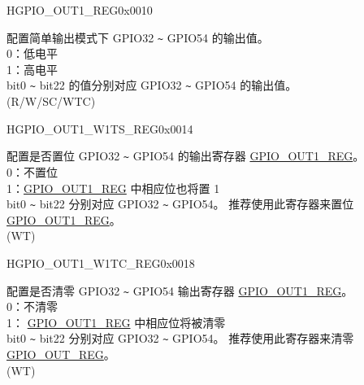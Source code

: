 \begin{register}{H}{GPIO\_OUT1\_REG}{0x0010}\label{regdesc:GPIOOUT1REG}
%
%
\regnewline%
\begin{regdesc}\begin{reglist}
\label{fielddesc:GPIOOUT1DATAORIG}\item [GPIO\_OUT1\_DATA\_ORIG] 配置简单输出模式下 GPIO32 \verb+~+ GPIO54 的输出值。\\
0：低电平\\
1：高电平 \\
 bit0 \verb+~+ bit22 的值分别对应 GPIO32 \verb+~+ GPIO54 的输出值。\\
(R/W/SC/WTC)
\end{reglist}\end{regdesc}
\end{register}


\begin{register}{H}{GPIO\_OUT1\_W1TS\_REG}{0x0014}\label{regdesc:GPIOOUT1W1TSREG}
%
%
\regnewline%
\begin{regdesc}\begin{reglist}
\label{fielddesc:GPIOOUT1W1TS}\item [GPIO\_OUT1\_W1TS] 配置是否置位
 GPIO32 \verb+~+ GPIO54 的输出寄存器 \hyperref[regdesc:GPIOOUT1REG]{GPIO\_OUT1\_REG}。\\
0：不置位\\
1：\hyperref[regdesc:GPIOOUT1REG]{GPIO\_OUT1\_REG} 中相应位也将置 1 \\
bit0 \verb+~+ bit22 分别对应 GPIO32 \verb+~+ GPIO54。
推荐使用此寄存器来置位  \hyperref[regdesc:GPIOOUT1REG]{GPIO\_OUT1\_REG}。\\
(WT)
\end{reglist}\end{regdesc}
\end{register}


\begin{register}{H}{GPIO\_OUT1\_W1TC\_REG}{0x0018}\label{regdesc:GPIOOUT1W1TCREG}
%
%
\regnewline%
\begin{regdesc}\begin{reglist}
\label{fielddesc:GPIOOUT1W1TC}\item [GPIO\_OUT1\_W1TC] 配置是否清零 GPIO32 \verb+~+ GPIO54 输出寄存器  \hyperref[regdesc:GPIOOUT1REG]{GPIO\_OUT1\_REG}。\\
0：不清零 \\
 1： \hyperref[regdesc:GPIOOUT1REG]{GPIO\_OUT1\_REG} 中相应位将被清零 \\
bit0 \verb+~+ bit22 分别对应 GPIO32 \verb+~+ GPIO54。
推荐使用此寄存器来清零  \hyperref[regdesc:GPIOOUT1REG]{GPIO\_OUT\_REG}。\\
(WT)
\end{reglist}\end{regdesc}
\end{register}


